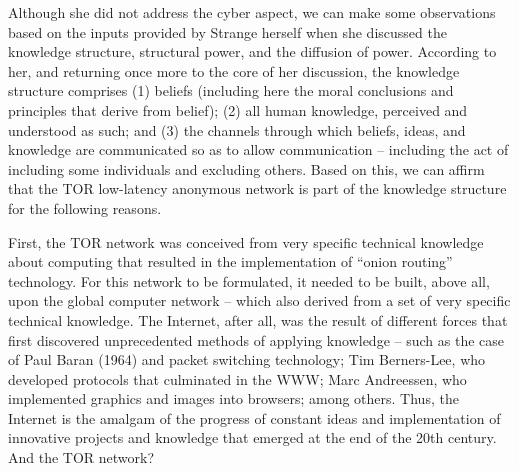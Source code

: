 Although she did not address the cyber aspect, we can make some observations based on the inputs provided by Strange herself when she discussed the knowledge structure, structural power, and the diffusion of power. According to her, and returning once more to the core of her discussion, the knowledge structure comprises (1) beliefs (including here the moral conclusions and principles that derive from belief); (2) all human knowledge, perceived and understood as such; and (3) the channels through which beliefs, ideas, and knowledge are communicated so as to allow communication -- including the act of including some individuals and excluding others. Based on this, we can affirm that the TOR low-latency anonymous network is part of the knowledge structure for the following reasons.

First, the TOR network was conceived from very specific technical knowledge about computing that resulted in the implementation of ``onion routing'' technology. For this network to be formulated, it needed to be built, above all, upon the global computer network -- which also derived from a set of very specific technical knowledge. The Internet, after all, was the result of different forces that first discovered unprecedented methods of applying knowledge -- such as the case of Paul Baran (1964) and packet switching technology; Tim Berners-Lee, who developed protocols that culminated in the WWW; Marc Andreessen, who implemented graphics and images into browsers; among others. Thus, the Internet is the amalgam of the progress of constant ideas and implementation of innovative projects and knowledge that emerged at the end of the 20th century. And the TOR network?

